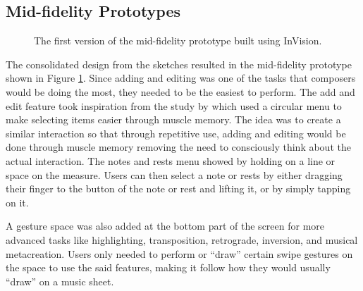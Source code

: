		\subsection{Mid-fidelity Prototypes}
		\label{sec:mid-fidelity-prototypes}

			\begin{figure}[H]
				\centering
			    \caption{The first version of the mid-fidelity prototype built using InVision.}
			    \label{fig:invision_v1}
			\end{figure} 

			The consolidated design from the sketches resulted in the mid-fidelity prototype shown in Figure \ref{fig:invision_v1}. Since adding and editing was one of the tasks that composers would be doing the most, they needed to be the easiest to perform. The add and edit feature took inspiration from the study by \citet{zhao2007earpod} which used a circular menu to make selecting items easier through muscle memory. The idea was to create a similar interaction so that through repetitive use, adding and editing would be done through muscle memory removing the need to consciously think about the actual interaction. The notes and rests menu showed by holding on a line or space on the measure. Users can then select a note or rests by either dragging their finger to the button of the note or rest and lifting it, or by simply tapping on it. 

			A gesture space was also added at the bottom part of the screen for more advanced tasks like highlighting, transposition, retrograde, inversion, and musical metacreation. Users only needed to perform or ``draw'' certain swipe gestures on the space to use the said features, making it follow how they would usually ``draw'' on a music sheet. 

